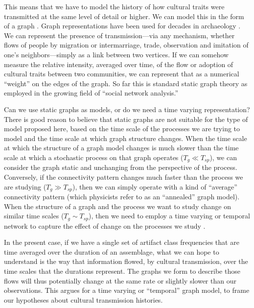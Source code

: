     This means that we have to model the history of how cultural traits were transmitted at the same level of detail or higher.  We can model this in the form of a graph \citep{diestel2010graph,Harary1969}.  Graph representations have been used for decades in archaeology . We can represent the presence of transmission---via any mechanism, whether flows of people by migration or intermarriage, trade, observation and imitation of one's neighbors---simply as a link between two vertices.  If we can somehow measure the relative intensity, averaged over time, of the flow or adoption of cultural traits between two communities, we can represent that as a numerical ``weight'' on the edges of the graph.  So far this is standard static graph theory as employed in the growing field of ``social network analysis.''  

    Can we use static graphs as models, or do we need a time varying representation?  There is good reason to believe that static graphs are not suitable for the type of model proposed here, based on the time scale of the processes we are trying to model and the time scale at which graph structure changes.  When the time scale at which the structure of a graph model changes is much slower than the time scale at which a stochastic process on that graph operates 
    ($T_g \ll T_{sp}$), we can consider the graph static and unchanging from the perspective of the process.  Conversely, if the connectivity pattern changes much faster than the process we are studying ($T_g \gg T_{sp}$), then we can simply operate with a kind of ``average'' connectivity pattern (which physicists refer to as an ``annealed'' graph model).  When the structure of a graph and the process we want to study change on similar time scales ($T_g \sim T_{sp}$), then we need to employ a time varying or temporal network to capture the effect of change on the processes we study .  
    
    In the present case, if we have a single set of artifact class frequencies that are time averaged over the duration of an assemblage, what we can hope to understand is the way that information flowed, by cultural transmission, over the time scales that the durations represent.  The graphs we form to describe those flows will thus potentially change at the same rate or slightly slower than our observations.  This argues for a time varying or ``temporal'' graph model, to frame our hypotheses about cultural transmission histories.

